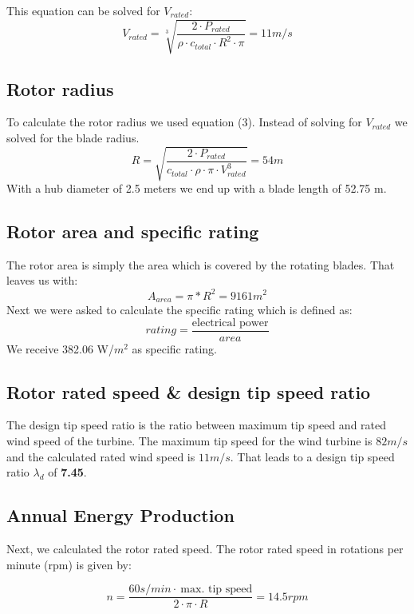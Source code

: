 \documentclass[10pt]{article}
\begin{document}
This equation can be solved for $V_{rated}$:
\begin{equation}
V_{rated} = \sqrt[3]{\frac{2 \cdot P_{rated}}{\rho\cdot c_{total}\cdot R^2 \cdot \pi}} = 11 m/s
\end{equation}
\subsection{Rotor radius}
To calculate the rotor radius we used equation (3). Instead of solving for $V_{rated}$ we solved for the blade radius.
\begin{equation}
R = \sqrt{\frac{2 \cdot P_{rated}}{c_{total} \cdot \rho \cdot \pi \cdot V_{rated}^3}} = 54 m
\end{equation}
With a hub diameter of 2.5 meters we end up with a blade length of 52.75 m.
\subsection{Rotor area and specific rating}
The rotor area is simply the area which is covered by the rotating blades. That leaves us with:
\begin{equation}
A_{area} = \pi * R^2 = 9161 m^2
\end{equation}
Next we were asked to calculate the specific rating which is defined as:
\begin{equation}
rating = \frac{\text{electrical power}}{area}
\end{equation}
We receive 382.06 W/$m^2$ as specific rating.
\subsection{Rotor rated speed \& design tip speed ratio}
The design tip speed ratio is the ratio between maximum tip speed and rated wind speed of the turbine. The maximum tip speed for the wind turbine is $82 m/s$ and the calculated rated wind speed is $11 m/s$. That leads to a design tip speed ratio $\lambda_d$ of \textbf{7.45}.\\\subsection{Annual Energy Production}
Next, we calculated the rotor rated speed. The rotor rated speed in rotations per minute (rpm) is given by:

\begin{equation}
n = \frac{60s/min \cdot\ \text{max. tip speed}}{2\cdot\pi\cdot R} = 14.5 rpm
\end{equation}
\end{document}
